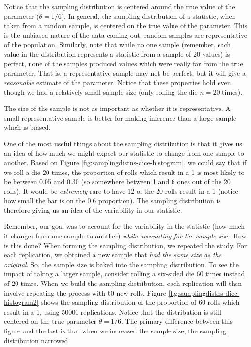 \documentclass[
]{book}
\theoremstyle{plain}
\theoremstyle{mydefn}
\theoremstyle{myexmpl}
\theoremstyle{remark}
\begin{document}
Notice that the sampling distribution is centered around the true value of the parameter (\(\theta = 1/6\)). In general, the sampling distribution of a statistic, when taken from a random sample, is centered on the true value of the parameter. This is the unbiased nature of the data coming out; random samples are representative of the population. Similarly, note that while no one sample (remember, each value in the distribution represents a statistic from a sample of 20 values) is perfect, none of the samples produced values which were really far from the true parameter. That is, a representative sample may not be perfect, but it will give a \emph{reasonable} estimate of the parameter. Notice that these properties hold even though we had a relatively small sample size (only rolling the die \(n = 20\) times).

\begin{rmdkeyidea}
The size of the sample is not as important as whether it is representative. A small representative sample is better for making inference than a large sample which is biased.
\end{rmdkeyidea}

One of the most useful things about the sampling distribution is that it gives us an idea of how much we might expect our statistic to change from one sample to another. Based on Figure \ref{fig:samplingdistns-dice-histogram}, we could say that if we roll a die 20 times, the proportion of rolls which result in a 1 is most likely to be between 0.05 and 0.30 (so somewhere between 1 and 6 ones out of the 20 rolls). It would be \emph{extremely} rare to have 12 of the 20 rolls result in a 1 (notice how small the bar is on the 0.6 proportion). The sampling distribution is therefore giving us an idea of the variability in our statistic.

Remember, our goal was to account for the variability in the statistic (how much it changes from one sample to another) \emph{while accounting for the sample size}. How is this done? When forming the sampling distribution, we repeated the study. For each replication, we obtained a new sample that \emph{had the same size as the original}. So, the sample size is baked into the sampling distribution. To see the impact of taking a larger sample, consider rolling a six-sided die 60 times instead of 20 times. When we build the sampling distribution, each replication will then involve repeating the process with 60 new rolls. Figure \ref{fig:samplingdistns-dice-histogram2} shows the sampling distribution of the proportion of 60 rolls which result in a 1, using 50000 replications. Notice that the distribution is still centered on the true parameter \(\theta = 1/6\). The primary difference between this figure and the last is that when we increased the sample size, the sampling distribution narrowed.
\end{document}
